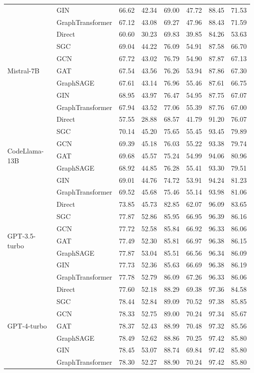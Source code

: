 \documentclass[11pt,UTF8,fontset=fandol]{ctexart}
\begin{document}
\begin{table}[H]
\begin{tabular}{llcc cc cc}
& GIN & 66.62 & 42.34 & 69.00 & 47.72 & 88.45 & 71.53\\
& GraphTransformer & 67.12 & 43.08 & 69.27 & 47.96 & 88.43 & 71.59\\
\midrule
\multirow{7}{*}{Mistral-7B}
& Direct & 60.60 & 30.23 & 69.83 & 39.85 & 84.26 & 53.63\\
& SGC & 69.04 & 44.22 & 76.09 & 54.91 & 87.58 & 66.70\\
& GCN & 67.72 & 43.02 & 76.79 & 54.90 & 87.87 & 67.13\\
& GAT & 67.54 & 43.56 & 76.26 & 53.94 & 87.86 & 67.30\\
& GraphSAGE & 67.61 & 43.14 & 76.96 & 55.46 & 87.61 & 66.75\\
& GIN & 68.95 & 43.97 & 76.47 & 54.95 & 87.75 & 67.07\\
& GraphTransformer & 67.94 & 43.52 & 77.06 & 55.39 & 87.76 & 67.00\\
\midrule
\multirow{7}{*}{CodeLlama-13B}
& Direct & 57.55 & 28.88 & 68.57 & 41.79 & 91.20 & 76.07\\
& SGC & 70.14 & 45.20 & 75.65 & 55.45 & 93.45 & 79.89\\
& GCN & 69.39 & 45.18 & 76.03 & 55.22 & 93.38 & 79.74\\
& GAT & 69.68 & 45.57 & 75.24 & 54.99 & 94.06 & 80.96\\
& GraphSAGE & 68.92 & 44.85 & 76.28 & 55.41 & 93.30 & 79.51\\
& GIN & 69.01 & 44.76 & 74.72 & 53.91 & 94.24 & 81.23\\
& GraphTransformer & 69.52 & 45.68 & 75.46 & 55.14 & 93.98 & 81.06\\
\midrule
\multirow{7}{*}{GPT-3.5-turbo}
& Direct & 73.85 & 45.73 & 82.85 & 62.07 & 96.09 & 83.65\\
& SGC & 77.87 & 52.86 & 85.95 & 66.95 & 96.39 & 86.16\\
& GCN & 77.72 & 52.58 & 85.84 & 66.92 & 96.33 & 86.06\\
& GAT & 77.49 & 52.30 & 85.81 & 66.97 & 96.38 & 86.15\\
& GraphSAGE & 77.87 & 53.04 & 85.51 & 66.56 & 96.34 & 86.09\\
& GIN & 77.73 & 52.36 & 85.63 & 66.69 & 96.38 & 86.19\\
& GraphTransformer & 77.78 & 52.79 & 86.09 & 67.26 & 96.33 & 86.06\\
\midrule
\multirow{7}{*}{GPT-4-turbo}
& Direct & 77.60 & 52.18 & 88.29 & 69.38 & 97.36 & 84.58\\
& SGC & 78.44 & 52.84 & 89.09 & 70.52 & 97.38 & 85.85\\
& GCN & 78.33 & 52.75 & 89.00 & 70.24 & 97.34 & 85.67\\
& GAT & 78.37 & 52.43 & 88.99 & 70.48 & 97.32 & 85.56\\
& GraphSAGE & 78.49 & 52.62 & 88.86 & 70.25 & 97.42 & 85.80\\
& GIN & 78.45 & 53.07 & 88.74 & 69.84 & 97.42 & 85.80\\
& GraphTransformer & 78.30 & 52.27 & 88.90 & 70.24 & 97.42 & 85.80\\
\bottomrule
\end{tabular}
\end{table}
\end{document}
